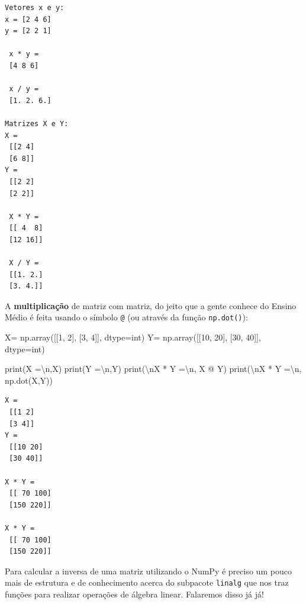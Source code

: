 \documentclass[
  brazilian,
  letterpaper,
  DIV=11,
  numbers=noendperiod]{scrreprt}
\newenvironment{Shaded}{\begin{snugshade}}{\end{snugshade}}
\newcommand{\BuiltInTok}[1]{\textcolor[rgb]{0.00,0.23,0.31}{#1}}
\newcommand{\CharTok}[1]{\textcolor[rgb]{0.13,0.47,0.30}{#1}}
\newcommand{\DecValTok}[1]{\textcolor[rgb]{0.68,0.00,0.00}{#1}}
\newcommand{\NormalTok}[1]{\textcolor[rgb]{0.00,0.23,0.31}{#1}}
\newcommand{\OperatorTok}[1]{\textcolor[rgb]{0.37,0.37,0.37}{#1}}
\newcommand{\StringTok}[1]{\textcolor[rgb]{0.13,0.47,0.30}{#1}}
\begin{document}
\begin{verbatim}
Vetores x e y:
x = [2 4 6]
y = [2 2 1]

 x * y =
 [4 8 6]

 x / y =
 [1. 2. 6.]

Matrizes X e Y:
X =
 [[2 4]
 [6 8]]
Y =
 [[2 2]
 [2 2]]

 X * Y =
 [[ 4  8]
 [12 16]]

 X / Y =
 [[1. 2.]
 [3. 4.]]
\end{verbatim}

A \textbf{multiplicação} de matriz com matriz, do jeito que a gente
conhece do Ensino Médio é feita usando o símbolo \texttt{@} (ou através
da função \texttt{np.dot()}):

\begin{Shaded}
\begin{Highlighting}[]
\NormalTok{X}\OperatorTok{=}\NormalTok{ np.array([[}\DecValTok{1}\NormalTok{, }\DecValTok{2}\NormalTok{], [}\DecValTok{3}\NormalTok{, }\DecValTok{4}\NormalTok{]], dtype}\OperatorTok{=}\BuiltInTok{int}\NormalTok{)}
\NormalTok{Y}\OperatorTok{=}\NormalTok{ np.array([[}\DecValTok{10}\NormalTok{, }\DecValTok{20}\NormalTok{], [}\DecValTok{30}\NormalTok{, }\DecValTok{40}\NormalTok{]], dtype}\OperatorTok{=}\BuiltInTok{int}\NormalTok{)}

\BuiltInTok{print}\NormalTok{(}\StringTok{\textquotesingle{}X =}\CharTok{\textbackslash{}n}\StringTok{\textquotesingle{}}\NormalTok{,X)}
\BuiltInTok{print}\NormalTok{(}\StringTok{\textquotesingle{}Y =}\CharTok{\textbackslash{}n}\StringTok{\textquotesingle{}}\NormalTok{,Y)}
\BuiltInTok{print}\NormalTok{(}\StringTok{\textquotesingle{}}\CharTok{\textbackslash{}n}\StringTok{X * Y =}\CharTok{\textbackslash{}n}\StringTok{\textquotesingle{}}\NormalTok{, X }\OperatorTok{@}\NormalTok{ Y)}
\BuiltInTok{print}\NormalTok{(}\StringTok{\textquotesingle{}}\CharTok{\textbackslash{}n}\StringTok{X * Y =}\CharTok{\textbackslash{}n}\StringTok{\textquotesingle{}}\NormalTok{, np.dot(X,Y))}
\end{Highlighting}
\end{Shaded}

\begin{verbatim}
X =
 [[1 2]
 [3 4]]
Y =
 [[10 20]
 [30 40]]

X * Y =
 [[ 70 100]
 [150 220]]

X * Y =
 [[ 70 100]
 [150 220]]
\end{verbatim}

Para calcular a inversa de uma matriz utilizando o NumPy é preciso um
pouco mais de estrutura e de conhecimento acerca do subpacote
\texttt{linalg} que nos traz funções para realizar operações de álgebra
linear. Falaremos disso já já!
\end{document}
